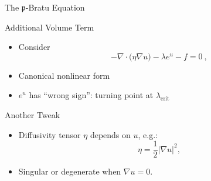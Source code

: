 \begin{frame}{The $\mathfrak{p}$-Bratu Equation}

  \begin{block}{Additional Volume Term}
  \begin{itemize}
   \item Consider
    \begin{equation*}
      -\nabla \cdot \bigl(\eta \nabla u \bigr) - \lambda e^u - f = 0 \ ,
    \end{equation*}
   \item Canonical nonlinear form
   \item $e^u$ has ``wrong sign'': turning point at $\lambda_{\text{crit}}$
  \end{itemize}
  \end{block}

  \begin{block}{Another Tweak}
  \begin{itemize}
   \item Diffusivity tensor $\eta$ depends on $u$, e.g.:
    \begin{equation*}
      \eta = \frac{1}{2} \vert \nabla u \vert^2,
    \end{equation*}
   \item Singular or degenerate when $\nabla u = 0$.
  \end{itemize}
  \end{block}
  
\end{frame}


